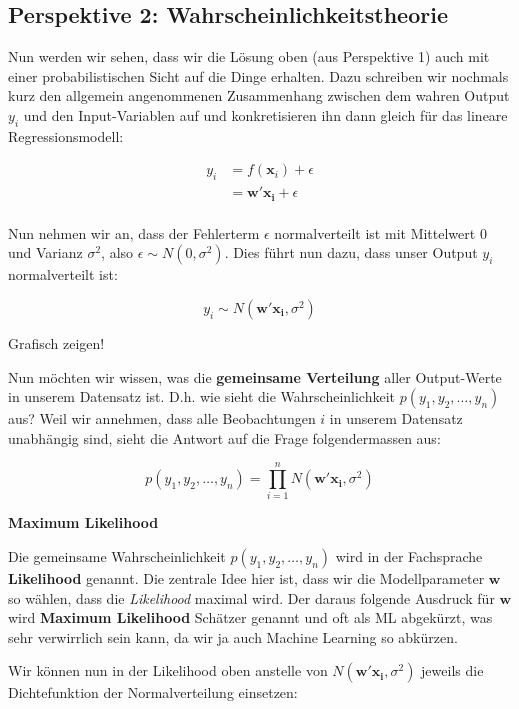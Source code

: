 \documentclass[
]{book}
\begin{document}
\hypertarget{perspektive-2-wahrscheinlichkeitstheorie}{%
\subsection{Perspektive 2: Wahrscheinlichkeitstheorie}\label{perspektive-2-wahrscheinlichkeitstheorie}}

Nun werden wir sehen, dass wir die Lösung oben (aus Perspektive 1) auch mit einer probabilistischen Sicht auf die Dinge erhalten. Dazu schreiben wir nochmals kurz den allgemein angenommenen Zusammenhang zwischen dem wahren Output \(y_i\) und den Input-Variablen auf und konkretisieren ihn dann gleich für das lineare Regressionsmodell:

\begin{align}
y_i &= f(\mathbf{x}_i) + \epsilon \\
&= \mathbf{w}' \mathbf{x_i} + \epsilon \\
\end{align}

Nun nehmen wir an, dass der Fehlerterm \(\epsilon\) normalverteilt ist mit Mittelwert 0 und Varianz \(\sigma^2\), also \(\epsilon \sim N(0,\sigma^2)\). Dies führt nun dazu, dass unser Output \(y_i\) normalverteilt ist:

\[
y_i \sim N\left(\mathbf{w}' \mathbf{x_i}, \sigma^2\right)
\]

Grafisch zeigen!

Nun möchten wir wissen, was die \textbf{gemeinsame Verteilung} aller Output-Werte in unserem Datensatz ist. D.h. wie sieht die Wahrscheinlichkeit \(p(y_1,y_2,\dots,y_n)\) aus? Weil wir annehmen, dass alle Beobachtungen \(i\) in unserem Datensatz unabhängig sind, sieht die Antwort auf die Frage folgendermassen aus:

\[
p(y_1,y_2,\dots,y_n) = \prod_{i=1}^n N\left(\mathbf{w}' \mathbf{x_i}, \sigma^2\right)
\]

\textbf{Maximum Likelihood}

Die gemeinsame Wahrscheinlichkeit \(p(y_1,y_2,\dots,y_n)\) wird in der Fachsprache \textbf{Likelihood} genannt. Die zentrale Idee hier ist, dass wir die Modellparameter \(\mathbf{w}\) so wählen, dass die \emph{Likelihood} maximal wird. Der daraus folgende Ausdruck für \(\mathbf{w}\) wird \textbf{Maximum Likelihood} Schätzer genannt und oft als ML abgekürzt, was sehr verwirrlich sein kann, da wir ja auch Machine Learning so abkürzen.

Wir können nun in der Likelihood oben anstelle von \(N\left(\mathbf{w}' \mathbf{x_i}, \sigma^2\right)\) jeweils die Dichtefunktion der Normalverteilung einsetzen:
\end{document}
